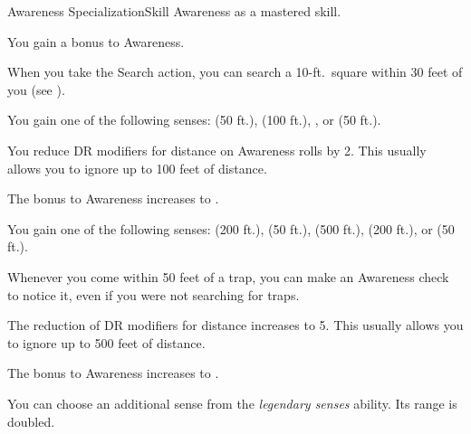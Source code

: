     \begin{feat}{Awareness Specialization}{Skill}
        \featpre Awareness as a mastered skill.

         You gain a  bonus to Awareness.

         When you take the Search action, you can search a 10-ft.\ square within 30 feet of you (see ).

         You gain one of the following senses:  (50 ft.),  (100 ft.), , or  (50 ft.).

         You reduce DR modifiers for distance on Awareness rolls by 2.
        This usually allows you to ignore up to 100 feet of distance.


         The bonus to Awareness increases to .

         You gain one of the following senses:  (200 ft.),  (50 ft.),  (500 ft.),  (200 ft.), or  (50 ft.).

         Whenever you come within 50 feet of a trap, you can make an Awareness check to notice it, even if you were not searching for traps.

         The reduction of DR modifiers for distance increases to 5.
        This usually allows you to ignore up to 500 feet of distance.

         The bonus to Awareness increases to .

         You can choose an additional sense from the \textit{legendary senses} ability.
        Its range is doubled.
    \end{feat}

